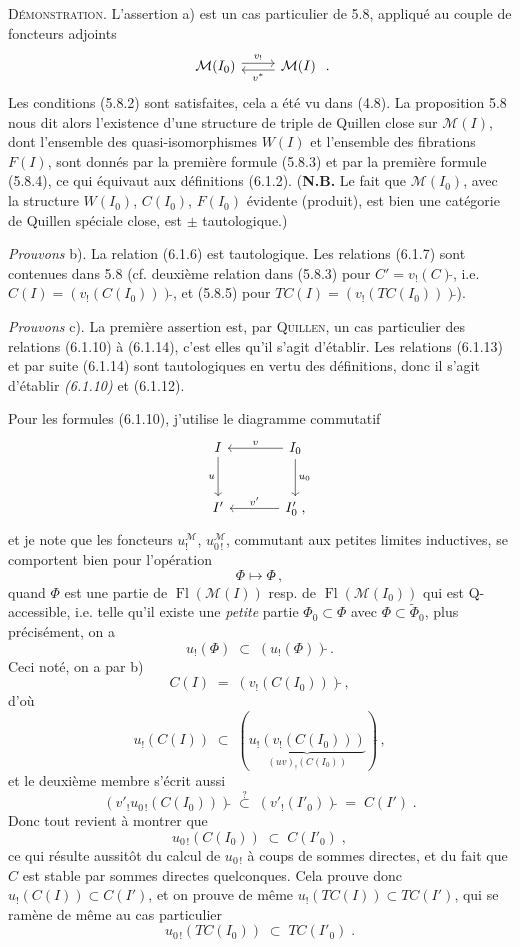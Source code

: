 \documentclass[11pt]{article}
\newcommand{\printedpage}[1]{\marginpar{\footnotesize p.~#1}}
\newcommand{\msp}[1]{\marginpar{\footnotesize [#1]}}
\newcommand{\Fl}{\operatorname{Fl}}
\newcommand{\tl}{\tilde{}}
\begin{document}
\textsc{Démonstration}. L'assertion a) est un cas particulier de 5.8, appliqué au couple de foncteurs adjoints
\[
\begin{tikzcd}
\mathcal{M}(I_0) \arrow[r, shift left, "v_!"] & \mathcal{M}(I) \arrow[l, shift left, "v^{*}"]
\end{tikzcd}
\;.
\]
Les conditions (5.8.2) sont satisfaites, cela a été vu dans (4.8). La proposition 5.8 nous dit alors l'existence d'une structure de triple de Quillen close sur $\mathcal{M}(I)$, dont l'ensemble des quasi-isomorphismes $W(I)$ et l'ensemble des fibrations $F(I)$, sont donnés par la première formule (5.8.3) et par la première formule (5.8.4), ce qui équivaut aux définitions (6.1.2). (\textbf{N.B.} Le fait que $\mathcal{M}(I_0)$, avec la structure $W(I_0)$, $C(I_0)$, $F(I_0)$ évidente (produit), est
\printedpage{51}
\msp{page 102}
bien une catégorie de Quillen spéciale close, est $\pm$ tautologique.)

\textit{Prouvons} b). La relation (6.1.6) est tautologique. Les relations (6.1.7) sont contenues dans 5.8 (cf. deuxième relation dans (5.8.3) pour $C' = v_!(C)\tl$, i.e. $C(I) = (v_!(C(I_0)))\tl$, et (5.8.5) pour $TC(I) = (v_!(TC(I_0)))\tl$).

\textit{Prouvons} c). La première assertion est, par \textsc{Quillen}, un cas particulier des relations (6.1.10) à (6.1.14), c'est elles qu'il s'agit d'établir. Les relations (6.1.13) et par suite (6.1.14) sont tautologiques en vertu des définitions, donc il s'agit d'établir \textit{(6.1.10)} et (6.1.12).

Pour les formules (6.1.10), j'utilise le diagramme commutatif
\[
\begin{tikzcd}[row sep=large, column sep=large]
I \arrow[d, "u"'] & I_0 \arrow[l, "v"'] \arrow[d, "u_0"] \\
I' & I'_0\;, \arrow[l, "v'"']
\end{tikzcd}
\]
et je note que les foncteurs $u_!^{\mathcal{M}}$, $u_{0\,!}^{\mathcal{M}}$, commutant aux petites limites inductives, se
\msp{page 103}
comportent bien pour l'opération
\[
\Phi \longmapsto \Phi\tl\,,
\]
quand $\Phi$ est une partie de $\Fl(\mathcal{M}(I))$ resp. de $\Fl(\mathcal{M}(I_0))$ qui est Q-accessible, i.e. telle qu'il existe une \textit{petite} partie $\Phi_0 \subset \Phi$ avec $\Phi \subset \tilde{\Phi}_0$, plus précisément, on a
\[
u_!(\Phi\tl) \;\subset\; (u_!(\Phi))\tl\,.
\]
Ceci noté, on a par b)
\[
C(I) \;=\; (v_!(C(I_0)))\tl\,,
\]
d'où
\[
u_!(C(I)) \;\subset\; (\underbrace{u_!(v_!(C(I_0)))}_{(uv)_!(C(I_0))})\tl\,,
\]
et le deuxième membre s'écrit aussi
\[
(v'_!u_{0\,!}(C(I_0)))\tl \;\overset{?}{\subset}\; (v'_!(I'_0))\tl \;=\; C(I')\;. %
\]
Donc tout revient à montrer que
\[
u_{0\,!}(C(I_0)) \;\subset\; C(I'_0)\;,
\tag*{(6.1.16)}
\]
ce qui résulte aussitôt du calcul de $u_{0\,!}$ à coups de sommes directes, et du fait que $C$ est stable par sommes directes quelconques. Cela prouve donc $u_!(C(I)) \subset C(I')$, et on prouve de même $u_!(TC(I)) \subset TC(I')$, qui se ramène de même au cas particulier
\[
u_{0\,!}(TC(I_0)) \;\subset\; TC(I'_0)\;.
\tag*{(6.1.17)}
\]
\end{document}
